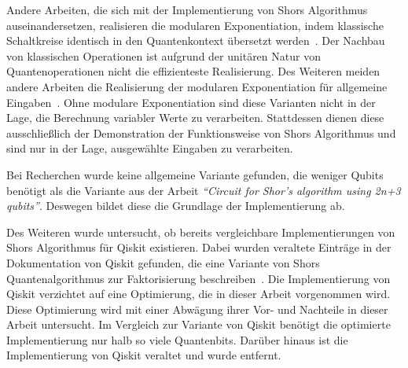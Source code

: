 Andere Arbeiten, die sich mit der Implementierung von Shors Algorithmus auseinandersetzen,
realisieren die modularen Exponentiation, 
indem klassische Schaltkreise identisch in den Quantenkontext übersetzt werden~\cite{Vedral_1996}.
Der Nachbau von klassischen Operationen ist aufgrund der unitären Natur von Quantenoperationen nicht die effizienteste Realisierung.
Des Weiteren meiden andere Arbeiten die Realisierung der modularen Exponentiation für allgemeine Eingaben~\cite{9376169,9686492}. 
Ohne modulare Exponentiation sind diese Varianten nicht in der Lage, 
die Berechnung variabler Werte zu verarbeiten.
Stattdessen dienen diese ausschließlich der Demonstration der Funktionsweise von Shors Algorithmus und
sind nur in der Lage, ausgewählte Eingaben zu verarbeiten.

Bei Recherchen wurde keine allgemeine Variante gefunden,
die weniger Qubits benötigt als die Variante aus der Arbeit \textit{"`Circuit for Shor’s algorithm using 2n+3 qubits"'}.
Deswegen bildet diese die Grundlage der Implementierung ab.

Des Weiteren wurde untersucht, 
ob bereits vergleichbare Implementierungen von Shors Algorithmus für Qiskit existieren. 
Dabei wurden veraltete Einträge in der Dokumentation von Qiskit gefunden, 
die eine Variante von Shors Quantenalgorithmus zur Faktorisierung beschreiben~\cite{QiskitShorImplementations}. 
Die Implementierung von Qiskit verzichtet auf eine Optimierung, die in dieser Arbeit vorgenommen wird. 
Diese Optimierung wird mit einer Abwägung ihrer Vor- und Nachteile in dieser Arbeit untersucht. 
Im Vergleich zur Variante von Qiskit benötigt die optimierte Implementierung nur halb so viele Quantenbits. 
Darüber hinaus ist die Implementierung von Qiskit veraltet und wurde entfernt.